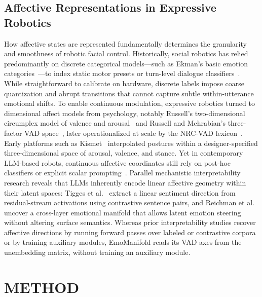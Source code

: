 \documentclass[letterpaper, 10 pt, conference]{ieeeconf}
\begin{document}
\subsection{Affective Representations in Expressive Robotics}
How affective states are represented fundamentally determines the granularity and smoothness of robotic facial control. Historically, social robotics has relied predominantly on discrete categorical models---such as Ekman's basic emotion categories~\cite{ekman1978facs}---to index static motor presets or turn-level dialogue classifiers~\cite{mishra2023realtime,cherakara2023furchat,kang2024nadine}. While straightforward to calibrate on hardware, discrete labels impose coarse quantization and abrupt transitions that cannot capture subtle within-utterance emotional shifts. To enable continuous modulation, expressive robotics turned to dimensional affect models from psychology, notably Russell's two-dimensional circumplex model of valence and arousal~\cite{russell1980circumplex} and Russell and Mehrabian's three-factor VAD space~\cite{russell1977evidence}, later operationalized at scale by the NRC-VAD lexicon~\cite{mohammad2018nrcvad}. Early platforms such as Kismet~\cite{breazeal2002designing} interpolated postures within a designer-specified three-dimensional space of arousal, valence, and stance. Yet in contemporary LLM-based robots, continuous affective coordinates still rely on post-hoc classifiers or explicit scalar prompting~\cite{antony2025xpress}. Parallel mechanistic interpretability research reveals that LLMs inherently encode linear affective geometry within their latent spaces: Tigges et al.~\cite{tigges2024sentiment} extract a linear sentiment direction from residual-stream activations using contrastive sentence pairs, and Reichman et al.~\cite{reichman2026emotions} uncover a cross-layer emotional manifold that allows latent emotion steering without altering surface semantics. Whereas prior interpretability studies recover affective directions by running forward passes over labeled or contrastive corpora or by training auxiliary modules, EmoManifold reads its VAD axes from the unembedding matrix, without training an auxiliary module.

\section{METHOD}
\label{sec:method}
\end{document}
